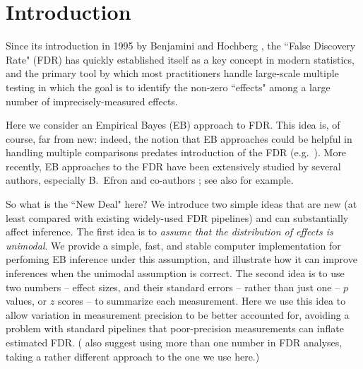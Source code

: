 \documentclass[11pt]{article}
\begin{document}

\section*{Introduction}

Since its introduction in 1995 by Benjamini and Hochberg 
\cite{benjamini1995controlling}, the ``False Discovery Rate" (FDR) has quickly established itself
as a key concept in modern statistics, and the primary tool by which most practitioners handle large-scale multiple testing
in which the goal is to identify the non-zero ``effects" among a large number of imprecisely-measured effects.

Here we consider an Empirical Bayes (EB) approach to FDR. This idea is, of course, far from new:
indeed, the notion that EB approaches could be helpful in handling multiple comparisons predates introduction of
the FDR  (e.g.~\cite{greenland1991empirical}). More recently, EB approaches to the FDR
have been extensively studied by several authors, 
especially B.~Efron and co-authors 
\cite{efron2001empirical, efron2002empirical,efron2003robbins,efron2008microarrays,efron2010large}; 
see also \cite{kendziorski2003parametric,newton2004detecting, 
datta2005empirical,muralidharan2010empirical} for example.

So what is the ``New Deal" here? We introduce two simple ideas that are new (at least compared with
existing widely-used FDR pipelines) and can substantially affect
inference. The first idea is to {\it assume that the distribution of effects is unimodal}.  We provide a simple, fast, and stable computer 
implementation for perfoming EB inference under this assumption, and illustrate how it can improve inferences 
when the unimodal assumption is correct.  
The second idea is to use two numbers -- effect sizes, and their standard errors -- rather than just one -- $p$ values, or $z$ scores -- 
to summarize each measurement. Here we use this idea to allow variation in measurement precision to be better accounted for,
 avoiding a problem with standard pipelines that poor-precision measurements can inflate estimated FDR.
(\cite{ploner2006multidimensional} also suggest using more than one number in FDR analyses, taking a
rather different approach to the one we use here.)
\end{document}
